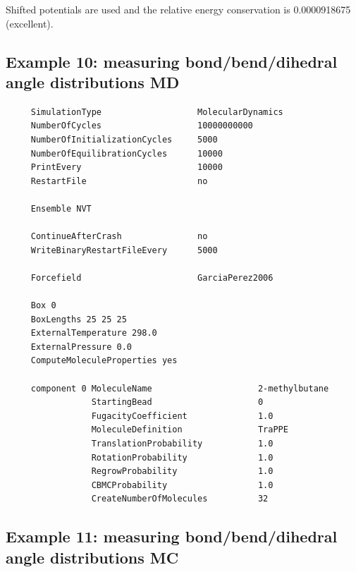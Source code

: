 Shifted potentials are used and the relative energy conservation is 0.0000918675 (excellent).

\subsection*{Example 10: measuring bond/bend/dihedral angle distributions MD}

\begin{tiny}
\begin{verbatim}
     SimulationType                   MolecularDynamics
     NumberOfCycles                   10000000000
     NumberOfInitializationCycles     5000
     NumberOfEquilibrationCycles      10000
     PrintEvery                       10000
     RestartFile                      no
     
     Ensemble NVT
     
     ContinueAfterCrash               no
     WriteBinaryRestartFileEvery      5000
     
     Forcefield                       GarciaPerez2006
     
     Box 0
     BoxLengths 25 25 25
     ExternalTemperature 298.0
     ExternalPressure 0.0
     ComputeMoleculeProperties yes
     
     component 0 MoleculeName                     2-methylbutane
                 StartingBead                     0
                 FugacityCoefficient              1.0
                 MoleculeDefinition               TraPPE
                 TranslationProbability           1.0
                 RotationProbability              1.0
                 RegrowProbability                1.0
                 CBMCProbability                  1.0
                 CreateNumberOfMolecules          32
\end{verbatim}
\end{tiny}

\subsection*{Example 11: measuring bond/bend/dihedral angle distributions MC}


